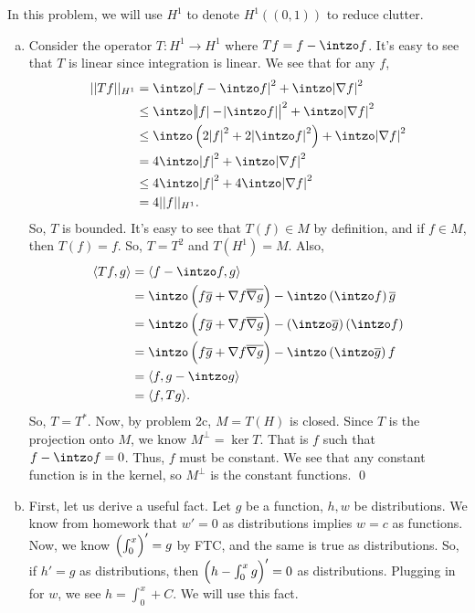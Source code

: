 \documentclass{article}
\newcommand{\D}{\nabla}
\begin{document}
\newpage
{} 
 \tri
\hop 
\solution
In this problem, we will use $H^1$ to denote $H^1((0,1))$ to reduce clutter.
\begin{enumerate}[(a)]
    \item Consider the operator $T: H^1 \to H^1$ where $Tf = f - \intzo f$. It's easy to see that $T$ is linear since integration is linear. We see that for any $f$, %
    \begin{align*}
        ||Tf||_{H^1} &= \intzo \abs{f - \intzo f}^2 + \intzo \abs{\D f}^2 \\
        &\le  \intzo \abs{\abs{f} - \abs{\intzo f}}^2 + \intzo \abs{\D f} ^2\\
        &\le  \intzo \del{2\abs{f}^2 +2 \abs{\intzo f}^2} + \intzo \abs{\D f}^2 \\
        &=  4\intzo \abs{f}^2 + \intzo \abs{\D f}^2 \\
        &\le  4\intzo \abs{f}^2 + 4\intzo \abs{\D f}^2 \\
        &= 4||f||_{H^1}.
    \end{align*}
    So, $T$ is bounded. It's easy to see that $T(f) \in M$ by definition, and if $f \in M$, then $T(f) = f$. So, $T = T^2$ and $T(H^1) = M$. Also, 
    \begin{align*}
        \ang{Tf, g} &= \ang{f-\intzo f, g } \\ 
        &= \intzo \del{f \ol{g} + \D f \ol{\D g}} - \intzo \del{\intzo f}\ol{g} \\
        &= \intzo \del{f \ol{g} + \D f \ol{\D g}} - \del{\intzo\ol{g}} \del{\intzo f} \\
        &= \intzo \del{f \ol{g} + \D f \ol{\D g}} - \intzo \del{\intzo \ol{g}}f \\
        &=\ang{f, g - \intzo g} \\
        &= \ang{f, Tg}.
    \end{align*}
    So, $T = T^*$. Now, by problem 2c, $M = T(H)$ is closed. 
    \hop 
    Since $T$ is the projection onto $M$, we know $M^\perp = \ker T$. That is $f$ such that $f - \intzo f = 0$. Thus, $f$ must be constant. We see that any constant function is in the kernel, so $M^\perp$ is the constant functions. \qed
    \item First, let us derive a useful fact. Let $g$ be a function, $h,w$ be distributions. We know from homework that $w' = 0$ as distributions implies $w = c$ as functions. Now, we know $\del{\int_0^x}' = g$ by FTC, and the same is true as distributions. So, if $h'= g$ as distributions, then $\del{h-\int_0^xg}' = 0$ as distributions. Plugging in for $w$, we see $h=  \int_0^x + C$. We will use this fact.

\end{enumerate}
\end{document}
